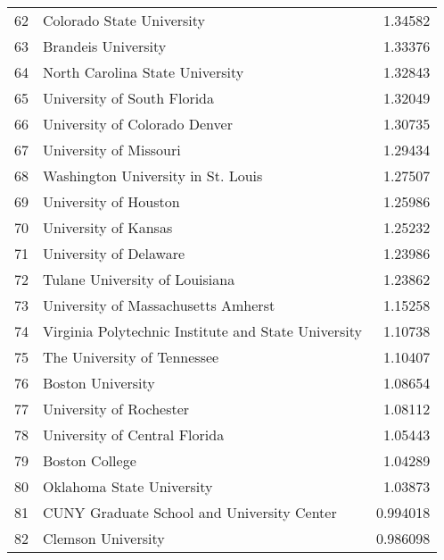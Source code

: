 \begin{tabular}{rlr}
  62 & Colorado State University                                      &  1.34582  \\
  63 & Brandeis University                                            &  1.33376  \\
  64 & North Carolina State University                                &  1.32843  \\
  65 & University of South Florida                                    &  1.32049  \\
  66 & University of Colorado Denver                                  &  1.30735  \\
  67 & University of Missouri                                         &  1.29434  \\
  68 & Washington University in St. Louis                             &  1.27507  \\
  69 & University of Houston                                          &  1.25986  \\
  70 & University of Kansas                                           &  1.25232  \\
  71 & University of Delaware                                         &  1.23986  \\
  72 & Tulane University of Louisiana                                 &  1.23862  \\
  73 & University of Massachusetts Amherst                            &  1.15258  \\
  74 & Virginia Polytechnic Institute and State University            &  1.10738  \\
  75 & The University of Tennessee                                    &  1.10407  \\
  76 & Boston University                                              &  1.08654  \\
  77 & University of Rochester                                        &  1.08112  \\
  78 & University of Central Florida                                  &  1.05443  \\
  79 & Boston College                                                 &  1.04289  \\
  80 & Oklahoma State University                                      &  1.03873  \\
  81 & CUNY Graduate School and University Center                     &  0.994018 \\
  82 & Clemson University                                             &  0.986098 \\

\end{tabular}
